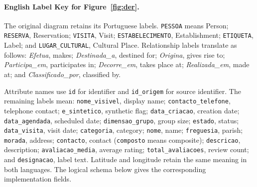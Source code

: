 \paragraph{English Label Key for Figure~\ref{fig:der}.}
The original diagram retains its Portuguese labels. \texttt{PESSOA} means Person; \texttt{RESERVA}, Reservation; \texttt{VISITA}, Visit; \texttt{ESTABELECIMENTO}, Establishment; \texttt{ETIQUETA}, Label; and \texttt{LUGAR\_CULTURAL}, Cultural Place. Relationship labels translate as follows: \emph{Efetua}, makes; \emph{Destinada\_a}, destined for; \emph{Origina}, gives rise to; \emph{Participa\_em}, participates in; \emph{Decorre\_em}, takes place at; \emph{Realizada\_em}, made at; and \emph{Classificado\_por}, classified by.

Attribute names use \texttt{id} for identifier and \texttt{id\_origem} for source identifier. The remaining labels mean: \texttt{nome\_visivel}, display name; \texttt{contacto\_telefone}, telephone contact; \texttt{e\_sintetico}, synthetic flag; \texttt{data\_criacao}, creation date; \texttt{data\_agendada}, scheduled date; \texttt{dimensao\_grupo}, group size; \texttt{estado}, status; \texttt{data\_visita}, visit date; \texttt{categoria}, category; \texttt{nome}, name; \texttt{freguesia}, parish; \texttt{morada}, address; \texttt{contacto}, contact (\texttt{composto} means composite); \texttt{descricao}, description; \texttt{avaliacao\_media}, average rating; \texttt{total\_avaliacoes}, review count; and \texttt{designacao}, label text. Latitude and longitude retain the same meaning in both languages. The logical schema below gives the corresponding implementation fields.

